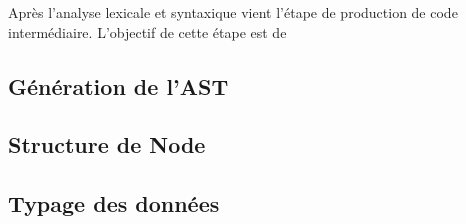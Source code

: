 Après l'analyse lexicale et syntaxique vient l'étape de production de code intermédiaire. L'objectif de cette étape est de

\subsection{Génération de l'AST}
\subsection{Structure de Node}
\subsection{Typage des données}